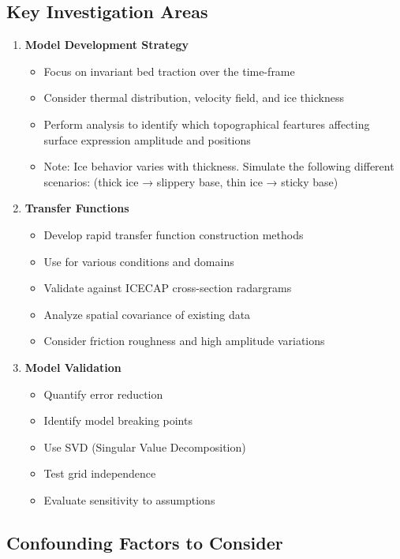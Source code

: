 \subsection*{Key Investigation Areas}
\begin{enumerate}
\item\textbf{Model Development Strategy}
    \begin{itemize}
    \item Focus on invariant bed traction over the time-frame
    \item Consider thermal distribution, velocity field, and ice thickness
    \item Perform analysis to identify which topographical feartures affecting surface expression amplitude and positions
    \item Note: Ice behavior varies with thickness. Simulate the following different scenarios: (thick ice → slippery base, thin ice → sticky base)
    \end{itemize}
\item\textbf{Transfer Functions}
    \begin{itemize}
    \item Develop rapid transfer function construction methods
    \item Use for various conditions and domains
    \item Validate against ICECAP cross-section radargrams
    \item Analyze spatial covariance of existing data
    \item Consider friction roughness and high amplitude variations
    \end{itemize}
\item\textbf{Model Validation}
    \begin{itemize}
    \item Quantify error reduction
    \item Identify model breaking points
    \item Use SVD (Singular Value Decomposition)
    \item Test grid independence
    \item Evaluate sensitivity to assumptions
    \end{itemize}
\end{enumerate}


\subsection*{Confounding Factors to Consider}


